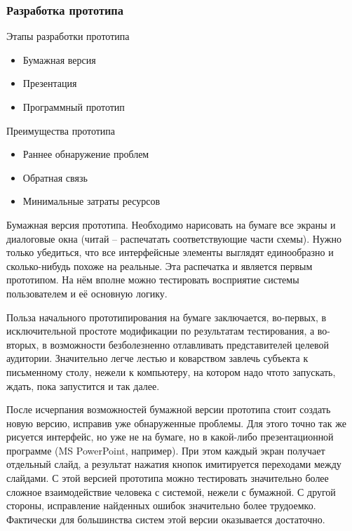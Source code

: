 \documentclass{../industrial-development}
\begin{document}
\begin{frame} \frametitle{Разработка прототипа}

  \begin{block}{Этапы разработки прототипа}
   \begin{itemize}
   \item Бумажная версия
   \item Презентация
   \item Программный прототип
   \end{itemize}
  \end{block}
  
  \begin{block}{Преимущества прототипа}
   \begin{itemize}
   \item Раннее обнаружение проблем
   \item Обратная связь
   \item Минимальные затраты ресурсов
   \end{itemize}
  \end{block}
\end{frame}

\lecturenotes

Бумажная версия прототипа. Необходимо нарисовать на бумаге все экраны и диалоговые окна (читай – распечатать соответствующие части схемы). Нужно только убедиться, что все интерфейсные элементы выглядят единообразно и сколько-нибудь похоже на реальные. Эта распечатка и является первым прототипом. На нём вполне можно тестировать восприятие системы пользователем и её основную логику.

Польза начального прототипирования на бумаге заключается, во-первых, в исключительной простоте модификации по результатам тестирования, а во-вторых, в возможности безболезненно отлавливать представителей целевой аудитории. Значительно легче лестью и коварством завлечь субъекта к письменному столу, нежели к компьютеру, на котором надо чтото запускать, ждать, пока запустится и так далее.

После исчерпания возможностей бумажной версии прототипа стоит создать новую версию, исправив уже обнаруженные проблемы. Для этого точно так же рисуется интерфейс, но уже не на бумаге, но в какой-либо презентационной программе (MS PowerPoint, например). При этом каждый экран получает отдельный слайд, а результат нажатия кнопок имитируется переходами между слайдами. С этой версией прототипа можно тестировать значительно более сложное взаимодействие человека с системой, нежели с бумажной. С другой стороны, исправление найденных ошибок значительно более трудоемко. Фактически для большинства систем этой версии оказывается достаточно.
\end{document}
